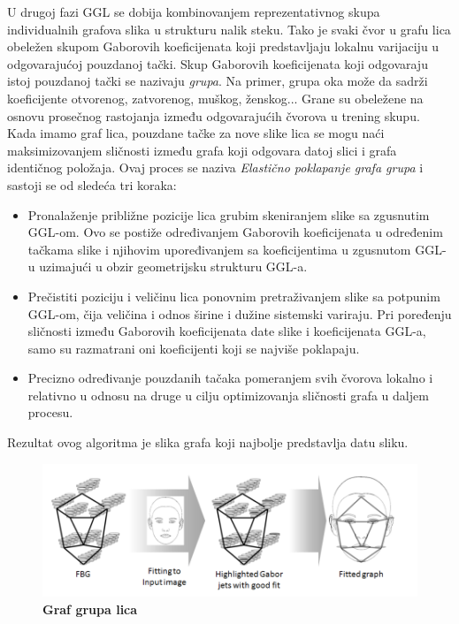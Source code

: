 \documentclass[11pt, a4paper]{article}
\begin{document}
\newpage

U drugoj fazi GGL se dobija kombinovanjem reprezentativnog skupa individualnih grafova slika u strukturu nalik steku. Tako je svaki čvor u grafu lica  obeležen skupom Gaborovih koeficijenata koji predstavljaju lokalnu varijaciju u odgovarajućoj pouzdanoj tački. Skup Gaborovih koeficijenata koji odgovaraju istoj pouzdanoj tački se nazivaju \textit{grupa}. Na primer, grupa oka može da sadrži  koeficijente otvorenog, zatvorenog, muškog, ženskog... Grane su obeležene na osnovu prosečnog rastojanja između odgovarajućih čvorova u trening skupu.
Kada imamo graf lica, pouzdane tačke za nove slike lica se mogu naći maksimizovanjem sličnosti između grafa koji odgovara datoj slici i grafa identičnog položaja. Ovaj proces se naziva \textit{Elastično poklapanje grafa grupa} i sastoji se od sledeća tri koraka:
\begin{itemize}
    \item Pronalaženje približne pozicije lica grubim skeniranjem slike sa zgusnutim GGL-om. Ovo se postiže određivanjem Gaborovih koeficijenata u određenim tačkama slike i njihovim upoređivanjem sa koeficijentima u zgusnutom GGL-u uzimajući u obzir geometrijsku strukturu GGL-a.
    \item Prečistiti poziciju i veličinu lica ponovnim pretraživanjem slike sa potpunim GGL-om, čija veličina i odnos širine i dužine sistemski variraju. Pri poređenju sličnosti između Gaborovih koeficijenata date slike i koeficijenata GGL-a, samo su razmatrani oni koeficijenti koji se najviše poklapaju.
    \item Precizno određivanje pouzdanih tačaka pomeranjem svih čvorova lokalno i relativno u odnosu na druge u cilju optimizovanja sličnosti grafa u daljem procesu.
\end{itemize}

Rezultat ovog algoritma je slika grafa koji najbolje predstavlja datu sliku.

\begin{figure}[h!]
	\centerline{\includegraphics[width=0.8\linewidth]{GGL.png}}
	\caption{\textbf{Graf grupa lica}}
	\label{fig:ggl}
\end{figure}
\end{document}
